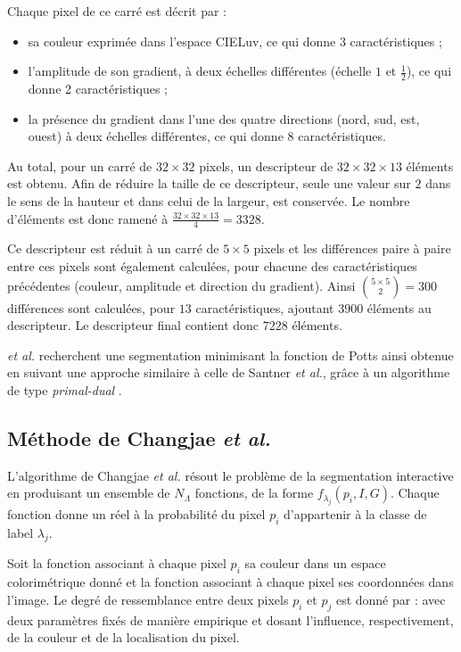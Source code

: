 \begin{emodif}
Chaque pixel de ce carré est décrit par :
\begin{itemize}
\item sa couleur exprimée dans l'espace CIELuv, ce qui donne 3 caractéristiques ;
\item l'amplitude de son gradient, à deux échelles différentes  (échelle $1$ et $\frac{1}{2}$), ce qui donne 2 caractéristiques ;
\item la présence du gradient dans l'une des quatre directions (nord, sud, est, ouest) à deux échelles différentes, ce qui donne 8 caractéristiques.
\end{itemize}
Au total, pour un carré de $32\times32$ pixels, un descripteur de $32\times32\times13$ éléments est obtenu. Afin de réduire la taille de ce descripteur, seule une valeur sur $2$ dans le sens de la hauteur et dans celui de la largeur, est conservée. Le nombre d'éléments est donc ramené à $\frac{32\times32\times13}{4}=3328$.

Ce descripteur est réduit à un carré de $5 \times 5$ pixels et les différences paire à paire entre ces pixels sont également calculées, pour chacune des caractéristiques précédentes (couleur, amplitude et direction du gradient). Ainsi $\binom{5\times5}{2}=300$ différences sont calculées, pour $13$ caractéristiques, ajoutant $3900$  éléments au descripteur. Le descripteur final contient donc $7228$ éléments. 
\end{emodif}


 \textit{et al.} \cite{muller2016robust} recherchent une segmentation minimisant la fonction de Potts ainsi obtenue en suivant une approche similaire à celle de Santner \textit{et al.}, grâce à un algorithme de type \emph{primal-dual} . 
 

\subsection{Méthode de Changjae \textit{et al.}}

L'algorithme de Changjae \textit{et al.} \cite{Changjae2017Robust} résout le problème de la segmentation interactive en produisant un ensemble de $N_{\Lambda}$ fonctions, de la forme $f_{\lambda_{j}}(p_{i},I,G)$. Chaque fonction donne un réel  à la probabilité du pixel $p_{i}$ d'appartenir à la classe de label $\lambda_{j}$.

Soit  la fonction associant à chaque pixel $p_{i}$ sa couleur dans un espace colorimétrique donné et  la fonction associant à chaque pixel ses coordonnées dans l'image. Le degré de ressemblance entre deux pixels $p_{i}$ et $p_{j}$ est donné par : 
avec  deux paramètres fixés de manière empirique et dosant l'influence, respectivement, de la couleur et de la localisation du pixel. 

